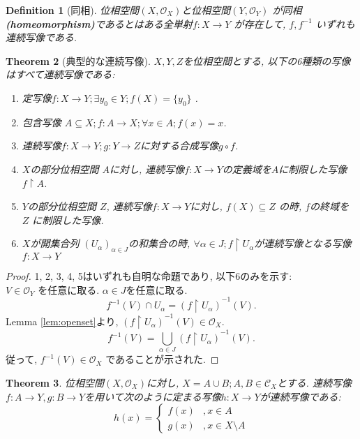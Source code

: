 \documentclass[lualatex]{ltjsbook}
\newtheorem{theorem}{Theorem}[chapter]
\newtheorem{definition}[theorem]{Definition}
\theoremstyle{remark}
\theoremstyle{plain}
\begin{document}
\begin{definition}[同相]
	位相空間$\left( X, \mathcal{O}_X \right) $と位相空間$\left( Y, \mathcal{O}_Y \right) $ が同相\textbf{(homeomorphism)}であるとはある全単射$f:X\to Y$ が存在して, $f, f^{-1}$ いずれも連続写像である.  
\end{definition}










\begin{theorem}[典型的な連続写像]
	$X, Y, Z$を位相空間とする,  以下の6種類の写像はすべて連続写像である:
	 \begin{enumerate}
		\item 定写像$f: X \to Y; \exists y_0 \in Y ; f(X) =\{y_0\} $ .
		\item 包含写像 $A\subseteq X ; f: A \to X; \forall x \in A; f(x)=x$.
		\item 連続写像$f:X\to Y; g:Y\to Z$に対する合成写像$g\circ f$.
		\item $X$の部分位相空間 $A$に対し, 連続写像$f:X\to Y$の定義域を$A$に制限した写像 $f\upharpoonright A$.
		\item  $Y$の部分位相空間 $Z$,  連続写像$f:X \to Y$に対し,  $f\left( X \right) \subseteq Z$ の時,  $f$の終域を $Z$ に制限した写像.
		\item $X$が開集合列 $\left(U_{\alpha}\right) _{\alpha \in J}$の和集合の時,   $\forall \alpha \in J; f\upharpoonright U_{\alpha}$が連続写像となる写像 $f:X \to Y$
	\end{enumerate}
\end{theorem}

\begin{proof}
	1, 2, 3, 4, 5はいずれも自明な命題であり,  以下6のみを示す:\\
	$V \in \mathcal{O}_Y$ を任意に取る. $\alpha \in J$を任意に取る.
	\[
	f^{-1}(V)\cap U_{\alpha} = (f\upharpoonright U_{\alpha})^{-1}(V)
	.\] 
	Lemma \ref{lem:openset}より,  $ (f\upharpoonright U_{\alpha})^{-1}(V) \in \mathcal{O}_X$.
	\[
	f^{-1}(V)=\bigcup_{\alpha \in J}  (f\upharpoonright U_{\alpha})^{-1}(V)
	.\]
	従って,  $f^{-1}(V) \in \mathcal{O}_X$ であることが示された.
\end{proof}

\begin{theorem}
\label{thm:paste}
	位相空間$(X, \mathcal{O}_X)$に対し, $X=A \cup B; A, B \in \mathcal{C}_X$とする. 連続写像$f:A\to Y, g:B\to Y$を用いて次のように定まる写像$h :X\to Y $が連続写像である:
	\[
	h\left( x\right) =
	\begin{cases}
		f(x) &, x \in A\\
		g(x) &, x \in X\setminus A
	\end{cases}
	\] 
\end{theorem}
\end{document}
